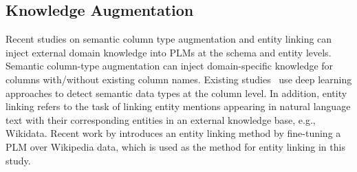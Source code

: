 \subsection{Knowledge Augmentation}
Recent studies on semantic column type augmentation and entity linking can inject external domain knowledge into PLMs at the schema and entity levels. 
Semantic column-type augmentation can inject domain-specific knowledge for columns with/without existing column names. Existing studies~\cite{hulsebos_sherlock_2019,suhara_annotating_2022} use deep learning approaches to detect semantic data types at the column level.
In addition, entity linking \cite{li_deep_2020} refers to the task of linking entity mentions appearing in natural language text with their corresponding entities in an external knowledge base, e.g., Wikidata. 
Recent work by \citet{ayoola_refined_2022} introduces an entity linking method by fine-tuning a PLM over Wikipedia data, which is used as the method for entity linking in this study. 

